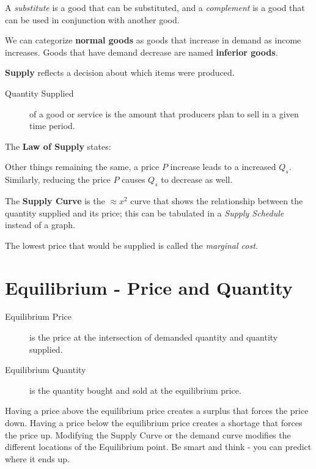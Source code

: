                 A \emph{substitute} is a good that can be substituted, and a \emph{complement} is a good that can be used in conjunction with another good.

                We can categorize \textbf{normal goods} as goods that increase in demand as income increases.
                Goods that have demand decrease are named \textbf{inferior goods}.

                \textbf{Supply} reflects a decision about which items were produced.
                \begin{description}
                    \item[Quantity Supplied] of a good or service is the amount that producers plan to sell in a given time period.
                \end{description}

                The \textbf{Law of Supply} states:

                Other things remaining the same, a price $P$ increase leads to a increased $Q_s$.
                Similarly, reducing the price $P$ causes $Q_s$ to decrease as well.

                The \textbf{Supply Curve} is the $\approx x^2$ curve that shows the relationship between the quantity supplied and its price; this can be tabulated in a \emph{Supply Schedule} instead of a graph.

                The lowest price that would be supplied is called the \emph{marginal cost}.
            \section{Equilibrium - Price and Quantity} %
            \label{sec:equilibrium_price_and_quantity}
                \begin{description}
                    \item[Equilibrium Price] is the price at the intersection of demanded quantity and quantity supplied.
                    \item[Equilibrium Quantity] is the quantity bought and sold at the equilibrium price.
                \end{description}

                Having a price above the equilibrium price creates a surplus that forces the price down.
                Having a price below the equilibrium price creates a shortage that forces the price up.
                Modifying the Supply Curve or the demand curve modifies the different locations of the Equilibrium point.
                Be smart and think - you can predict where it ends up.

